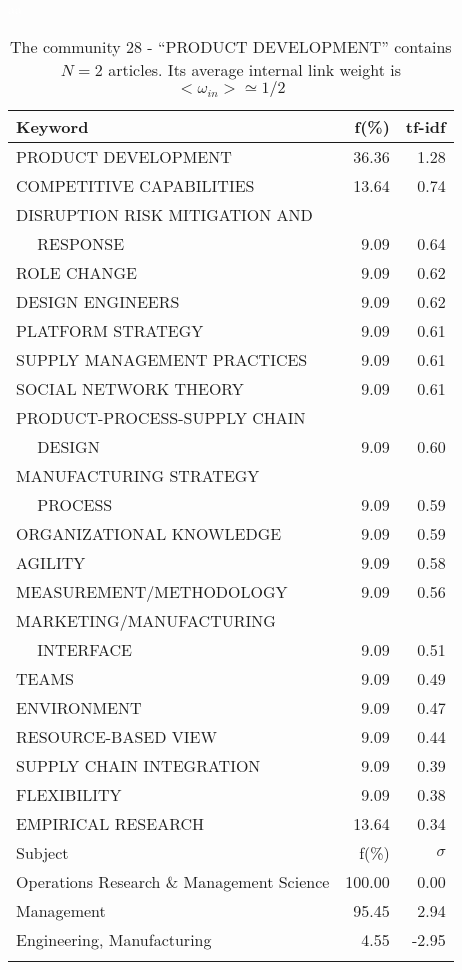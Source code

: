 \documentclass[a4paper,11pt]{report}
\begin{document}
\begin{landscape}
\clearpage

\begin{table}[!ht]
\caption{The community 28 - ``PRODUCT DEVELOPMENT'' contains $N = 2$ articles. Its average internal link weight is $<\omega_{in}> \simeq 1/2$ }
\textcolor{white}{aa}\\
{\scriptsize\begin{tabular}{|l r  r|}
\hline
Keyword & f(\%) & tf-idf \\
\hline
PRODUCT DEVELOPMENT & 36.36 & 1.28\\
COMPETITIVE CAPABILITIES & 13.64 & 0.74\\
DISRUPTION RISK MITIGATION AND &  &\\
$\quad$ RESPONSE & 9.09 & 0.64\\
ROLE CHANGE & 9.09 & 0.62\\
DESIGN ENGINEERS & 9.09 & 0.62\\
PLATFORM STRATEGY & 9.09 & 0.61\\
SUPPLY MANAGEMENT PRACTICES & 9.09 & 0.61\\
SOCIAL NETWORK THEORY & 9.09 & 0.61\\
PRODUCT-PROCESS-SUPPLY CHAIN &  &\\
$\quad$ DESIGN & 9.09 & 0.60\\
MANUFACTURING STRATEGY &  &\\
$\quad$ PROCESS & 9.09 & 0.59\\
ORGANIZATIONAL KNOWLEDGE & 9.09 & 0.59\\
AGILITY & 9.09 & 0.58\\
MEASUREMENT/METHODOLOGY & 9.09 & 0.56\\
MARKETING/MANUFACTURING &  &\\
$\quad$ INTERFACE & 9.09 & 0.51\\
TEAMS & 9.09 & 0.49\\
ENVIRONMENT & 9.09 & 0.47\\
RESOURCE-BASED VIEW & 9.09 & 0.44\\
SUPPLY CHAIN INTEGRATION & 9.09 & 0.39\\
FLEXIBILITY & 9.09 & 0.38\\
EMPIRICAL RESEARCH & 13.64 & 0.34\\
\hline
\hline
Subject & f(\%) & $\sigma$\\
\hline
Operations Research \& Management Science & 100.00 & 0.00\\
Management & 95.45 & 2.94\\
Engineering, Manufacturing & 4.55 & -2.95\\
 &  & \\

\end{tabular}}
\end{table}
\end{landscape}
\end{document}
